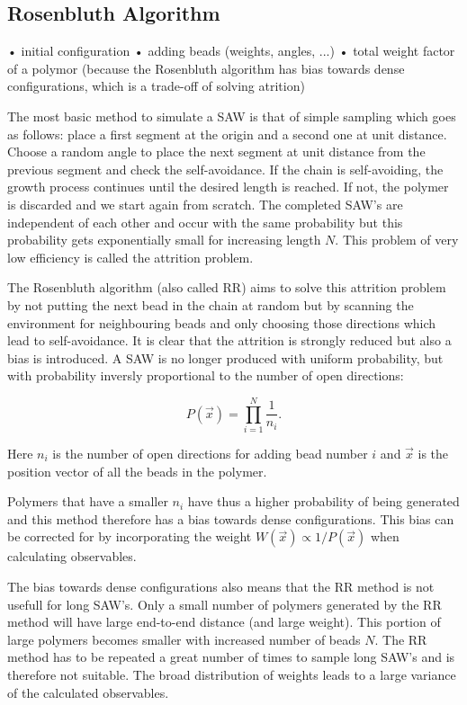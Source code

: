 \subsection*{Rosenbluth Algorithm}
		• initial configuration
		• adding beads (weights, angles, ...)
		• total weight factor of a polymor (because the Rosenbluth algorithm has bias towards dense configurations, which is a trade-off of solving atrition)

The most basic method to simulate a SAW is that of simple sampling which goes as follows: place a first segment at the origin and a second one at unit distance. Choose a random angle to place the next segment at unit distance from the previous segment and check the self-avoidance. If the chain is self-avoiding, the growth process continues until the desired length is reached. If not, the polymer is discarded and we start again from scratch. The completed SAW's are independent of each other and occur with the same probability but this probability gets exponentially small for increasing length $N$. This problem of very low efficiency is called the attrition problem.

The Rosenbluth algorithm (also called RR) aims to solve this attrition problem by not putting the next bead in the chain at random but by scanning the environment for neighbouring beads and only choosing those directions which lead to self-avoidance. It is clear that the attrition is strongly reduced but also a bias is introduced. A SAW is no longer produced with uniform probability, but with probability inversly proportional to the number of open directions:

\begin{equation} \label{eq:prob_RR}
	P\left(\vec{x}\right) = \prod_{i=1}^{N} \frac{1}{n_i} .
\end{equation}

Here $n_i$ is the number of open directions for adding bead number $i$ and $\vec{x}$ is the position vector of all the beads in the polymer.

Polymers that have a smaller $n_i$ have thus a higher probability of being generated and this method therefore has a bias towards dense configurations. This bias can be corrected for by incorporating the weight $W\left( \vec{x} \right) \propto 1/ P\left( \vec{x} \right)$ when calculating observables.

The bias towards dense configurations also means that the RR method is not usefull for long SAW's. Only a small number of polymers generated by the RR method will have large end-to-end distance (and large weight). This portion of large polymers becomes smaller with increased number of beads $N$. The RR method has to be repeated a great number of times to sample long SAW's and is therefore not suitable. The broad distribution of weights leads to a large variance of the calculated observables.

